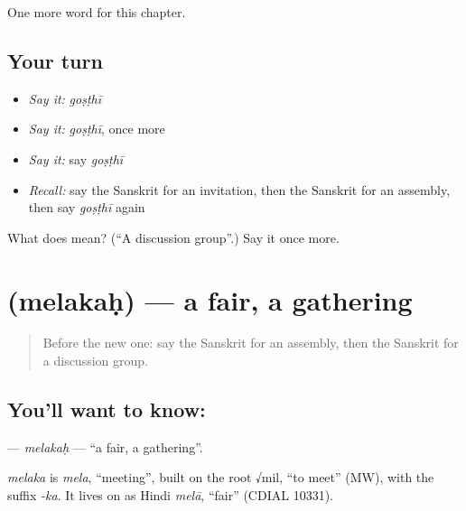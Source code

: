 \begin{grammarlens}[title={What you've built}]
One more word for this chapter.
\end{grammarlens}

\subsection*{Your turn}
\begin{itemize}
\raggedright
  \item \emph{Say it:} \emph{goṣṭhī}
  \item \emph{Say it:} \emph{goṣṭhī}, once more
  \item \emph{Say it:} say \emph{goṣṭhī}
  \item \emph{Recall:} say the Sanskrit for an invitation, then the Sanskrit for an assembly, then say \emph{goṣṭhī} again
\end{itemize}

\begin{tcolorbox}[breakable,colback=teal!4,colframe=teal!35!black,title={Before you move on}]
What does  mean? (\textquotedblleft{}A discussion group\textquotedblright{}.) Say it once more.
\end{tcolorbox}
\section[\texorpdfstring{\sk{मेलकः} (melakaḥ)}{मेलकः (melakaḥ)}]{ (melakaḥ) — a fair, a gathering}

\label{lesson:SA-C194-melakah}



\begin{quote}
Before the new one: say the Sanskrit for an assembly, then the Sanskrit for a discussion group.
\end{quote}

\subsection*{You'll want to know: }
\textbf{} — \emph{melakaḥ} — \textquotedblleft{}a fair, a gathering\textquotedblright{}.

\begin{cousinweb}
\emph{melaka} is \emph{mela}, \textquotedblleft{}meeting\textquotedblright{}, built on the root √mil, \textquotedblleft{}to meet\textquotedblright{} (MW), with the suffix \emph{-ka}. It lives on as Hindi \emph{melā}, \textquotedblleft{}fair\textquotedblright{} (CDIAL 10331).
\end{cousinweb}

